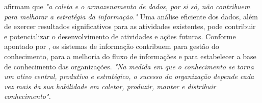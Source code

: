 \citet[p. 497]{cardoso_machado2008} afirmam que \textit{"a coleta e o armazenamento de dados, por si só, não contribuem para melhorar a estratégia da informação."} Uma análise eficiente dos dados, além de exercer resultados significativos para as atividades existentes, pode contribuir e potencializar o desenvolvimento de atividades e ações futuras. Conforme apontado por \citet[p.288]{laudon}, os sistemas de informação contribuem para gestão do conhecimento, para a melhoria do fluxo de informações e para estabelecer a base de conhecimento das organizações. \textit{"Na medida em que o conhecimento se torna um ativo central, produtivo e estratégico, o sucesso da organização depende cada vez mais da sua habilidade em coletar, produzir, manter e distribuir conhecimento".}


 

	

